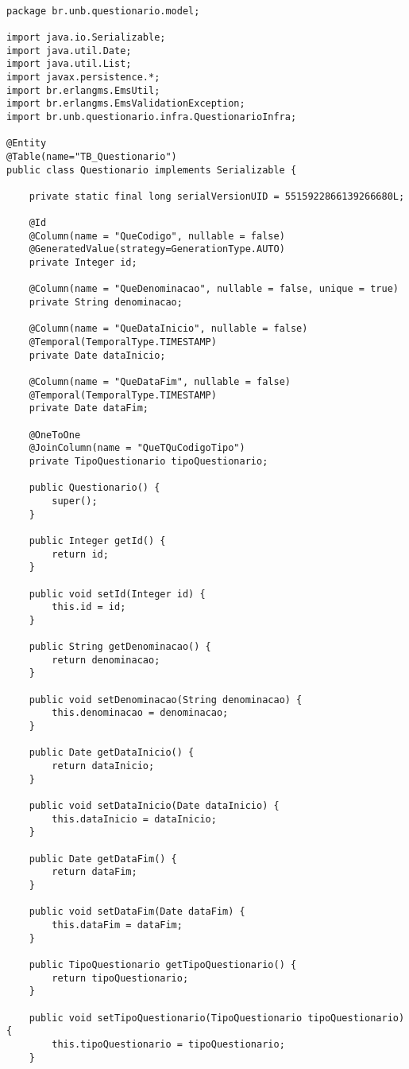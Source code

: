 \begin{lstlisting} 

package br.unb.questionario.model;

import java.io.Serializable;
import java.util.Date;
import java.util.List;
import javax.persistence.*;
import br.erlangms.EmsUtil;
import br.erlangms.EmsValidationException;
import br.unb.questionario.infra.QuestionarioInfra;

@Entity
@Table(name="TB_Questionario")
public class Questionario implements Serializable {

	private static final long serialVersionUID = 5515922866139266680L;

	@Id
    @Column(name = "QueCodigo", nullable = false)
	@GeneratedValue(strategy=GenerationType.AUTO)
	private Integer id;

	@Column(name = "QueDenominacao", nullable = false, unique = true)
	private String denominacao;
	
	@Column(name = "QueDataInicio", nullable = false)
	@Temporal(TemporalType.TIMESTAMP)
	private Date dataInicio;

	@Column(name = "QueDataFim", nullable = false)
	@Temporal(TemporalType.TIMESTAMP)
	private Date dataFim;

	@OneToOne
	@JoinColumn(name = "QueTQuCodigoTipo")
	private TipoQuestionario tipoQuestionario;
	
	public Questionario() {
		super();
	}

	public Integer getId() {
		return id;
	}

	public void setId(Integer id) {
		this.id = id;
	}

	public String getDenominacao() {
		return denominacao;
	}

	public void setDenominacao(String denominacao) {
		this.denominacao = denominacao;
	}

	public Date getDataInicio() {
		return dataInicio;
	}

	public void setDataInicio(Date dataInicio) {
		this.dataInicio = dataInicio;
	}

	public Date getDataFim() {
		return dataFim;
	}

	public void setDataFim(Date dataFim) {
		this.dataFim = dataFim;
	}

	public TipoQuestionario getTipoQuestionario() {
		return tipoQuestionario;
	}

	public void setTipoQuestionario(TipoQuestionario tipoQuestionario) {
		this.tipoQuestionario = tipoQuestionario;
	}


\end{lstlisting}
